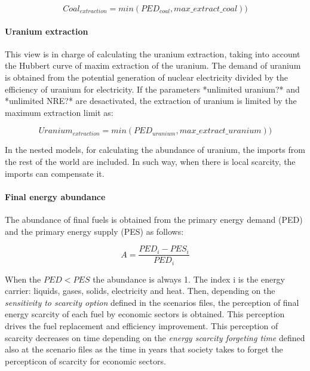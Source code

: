\begin{equation}
Coal_{extraction}=min(PED_{coal}, max\_extract\_coal))
\end{equation}

\paragraph{Uranium extraction}

This view is in charge of calculating the uranium extraction, taking into account the Hubbert curve of maxim extraction of the uranium. The demand of uranium is obtained from the potential generation of nuclear electricity divided by the efficiency of uranium for electricity. If the parameters *unlimited uranium?* and *unlimited NRE?* are desactivated, the extraction of uranium is limited by the maximum extraction limit as:

\begin{equation}
Uranium_{extraction}=min(PED_{uranium}, max\_extract\_uranium))
\end{equation}

In the nested models, for calculating the abundance of uranium, the imports from the rest of the world are included. In such way, when there is local scarcity, the imports can compensate it.


\paragraph{Final energy abundance}

The abundance of final fuels is obtained from the primary energy demand (PED) and the primary energy supply (PES) as follows:

\begin{equation}
A= \frac{PED_i-PES_i}{PED_i}
\end{equation}

When the $PED<PES$ the abundance is always 1. The index i is the energy carrier: liquids, gases, solids, electricity and heat.
Then, depending on the \emph{sensitivity to scarcity option} defined in the scenarios files, the perception of final energy scarcity of each fuel by economic sectors is obtained. This perception drives the fuel replacement and efficiency improvement. This perception of scarcity decreases on time depending on the \emph{energy scarcity forgeting time} defined also at the scenario files as the time in years that society takes to forget the percepticon of scarcity for economic sectors.